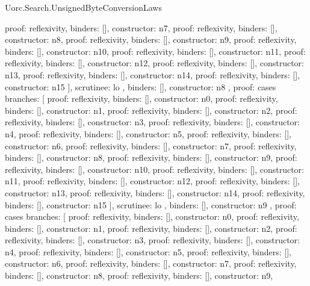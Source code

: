 \begin{lexlean}{Uorc.Search.UnsignedByteConversionLaws}
\begin{semanticmodule}
{{{{            {proof: reflexivity{}, binders: [], constructor: n7},
            {proof: reflexivity{}, binders: [], constructor: n8},
            {proof: reflexivity{}, binders: [], constructor: n9},
            {proof: reflexivity{}, binders: [], constructor: n10},
            {proof: reflexivity{}, binders: [], constructor: n11},
            {proof: reflexivity{}, binders: [], constructor: n12},
            {proof: reflexivity{}, binders: [], constructor: n13},
            {proof: reflexivity{}, binders: [], constructor: n14},
            {proof: reflexivity{}, binders: [], constructor: n15}
          ],
          scrutinee: lo
        },
        binders: [],
        constructor: n8
      },
      {
        proof: cases{
          branches: [
            {proof: reflexivity{}, binders: [], constructor: n0},
            {proof: reflexivity{}, binders: [], constructor: n1},
            {proof: reflexivity{}, binders: [], constructor: n2},
            {proof: reflexivity{}, binders: [], constructor: n3},
            {proof: reflexivity{}, binders: [], constructor: n4},
            {proof: reflexivity{}, binders: [], constructor: n5},
            {proof: reflexivity{}, binders: [], constructor: n6},
            {proof: reflexivity{}, binders: [], constructor: n7},
            {proof: reflexivity{}, binders: [], constructor: n8},
            {proof: reflexivity{}, binders: [], constructor: n9},
            {proof: reflexivity{}, binders: [], constructor: n10},
            {proof: reflexivity{}, binders: [], constructor: n11},
            {proof: reflexivity{}, binders: [], constructor: n12},
            {proof: reflexivity{}, binders: [], constructor: n13},
            {proof: reflexivity{}, binders: [], constructor: n14},
            {proof: reflexivity{}, binders: [], constructor: n15}
          ],
          scrutinee: lo
        },
        binders: [],
        constructor: n9
      },
      {
        proof: cases{
          branches: [
            {proof: reflexivity{}, binders: [], constructor: n0},
            {proof: reflexivity{}, binders: [], constructor: n1},
            {proof: reflexivity{}, binders: [], constructor: n2},
            {proof: reflexivity{}, binders: [], constructor: n3},
            {proof: reflexivity{}, binders: [], constructor: n4},
            {proof: reflexivity{}, binders: [], constructor: n5},
            {proof: reflexivity{}, binders: [], constructor: n6},
            {proof: reflexivity{}, binders: [], constructor: n7},
            {proof: reflexivity{}, binders: [], constructor: n8},
            {proof: reflexivity{}, binders: [], constructor: n9},
}}}}
\end{semanticmodule}
\end{lexlean}

